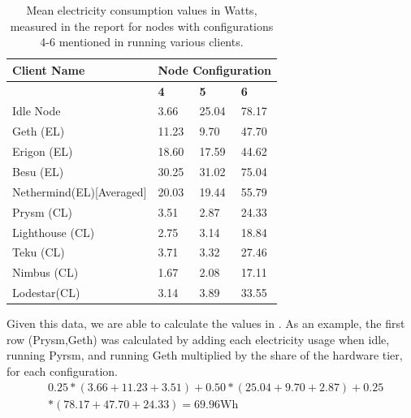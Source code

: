 \begin{table}[htb!]
\centering
\begin{tabular}{|l|lll|}
\hline
\textbf{Client Name} & \multicolumn{3}{l|}{\textbf{Node Configuration}}                               \\ \hline
\textbf{}            & \multicolumn{1}{l|}{\textbf{4}} & \multicolumn{1}{l|}{\textbf{5}} & \textbf{6} \\ \hline
Idle Node                & \multicolumn{1}{l|}{3.66}       & \multicolumn{1}{l|}{25.04}      & 78.17      \\ \cline{1-1}
Geth (EL)            & \multicolumn{1}{l|}{11.23}      & \multicolumn{1}{l|}{9.70}       & 47.70      \\ \cline{1-1}
Erigon (EL)          & \multicolumn{1}{l|}{18.60}      & \multicolumn{1}{l|}{17.59}      & 44.62      \\ \cline{1-1}
Besu (EL)            & \multicolumn{1}{l|}{30.25}      & \multicolumn{1}{l|}{31.02}      & 75.04      \\ \cline{1-1}
Nethermind(EL)[Averaged] & \multicolumn{1}{l|}{20.03}       & \multicolumn{1}{l|}{19.44}       & 55.79      \\ \cline{1-1}
Prysm (CL)           & \multicolumn{1}{l|}{3.51}       & \multicolumn{1}{l|}{2.87}       & 24.33      \\ \cline{1-1}
Lighthouse (CL)      & \multicolumn{1}{l|}{2.75}       & \multicolumn{1}{l|}{3.14}       & 18.84      \\ \cline{1-1}
Teku (CL)            & \multicolumn{1}{l|}{3.71}       & \multicolumn{1}{l|}{3.32}       & 27.46      \\ \cline{1-1}
Nimbus (CL)          & \multicolumn{1}{l|}{1.67}       & \multicolumn{1}{l|}{2.08}       & 17.11      \\ \cline{1-1}
Lodestar(CL)         & \multicolumn{1}{l|}{3.14}       & \multicolumn{1}{l|}{3.89}       & 33.55      \\ \hline

\end{tabular}
\caption{Mean electricity consumption values in Watts, measured in the report \cite{CryptoCarbonRatingsInstitute2022TheNetwork} for nodes with configurations 4-6 mentioned in   running various clients.  }
\label{Table:ConsumptionValues}
\end{table}

Given this data, we are able to calculate the values in . As an example, the first row (Prysm,Geth) was calculated by adding each electricity usage when idle, running Pyrsm, and running Geth multiplied by the share of the hardware tier, for each configuration.
\begin{align}
    &\boldsymbol{0.25*(3.66 + 11.23 + 3.51) + 0.50 * (25.04 + 9.70 + 2.87) + 0.25} \nonumber\\
    &\boldsymbol{* (78.17 + 47.70 + 24.33) = 69.96}\text{Wh} \nonumber
\end{align}

